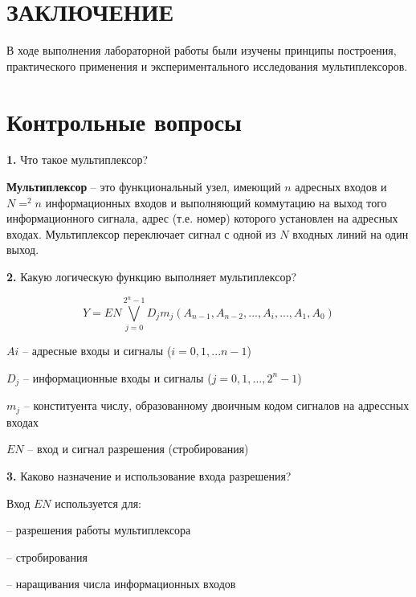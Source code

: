 \section*{ЗАКЛЮЧЕНИЕ}

В ходе выполнения лабораторной работы были изучены принципы построения, практического
применения и экспериментального исследования мультиплексоров.

\section*{Контрольные вопросы}

\noindent\textbf{1.} Что такое мультиплексор?\newline

\noindent\textbf{Мультиплексор} -- это функциональный узел, имеющий $n$ адресных входов и $N=^2n$ информационных входов и выполняющий коммутацию на выход того информационного сигнала, адрес (т.е. номер) которого установлен на адресных входах. Мультиплексор переключает сигнал с одной из $N$ входных линий на один выход.
\newline

\noindent\textbf{2.} Какую логическую функцию выполняет мультиплексор? \newline

\noindent
$$ Y = EN \bigvee\limits_{j=0}^{2^n - 1} D_{j} m_{j}(A_{n-1}, A_{n - 2}, ... , A_{i}, ... , A_{1}, A_{0})$$

\noindent $A{i}$ -- адресные входы и сигналы ($i =0, 1, ... n - 1$)

\noindent $D_{j}$ -- информационные входы и сигналы ($j = 0, 1, ..., 2^n-1$)

\noindent $m_{j}$ -- конституента числу, образованному двоичным кодом сигналов на адрессных входах

\noindent $EN$ -- вход и сигнал разрешения (стробирования)\newline

\noindent\textbf{3.} Каково назначение и использование входа разрешения?\newline

\noindent Вход $EN$ используется для:\newline

\noindent -- разрешения работы мультиплексора

\noindent -- стробирования

\noindent -- наращивания числа информационных входов\newline

